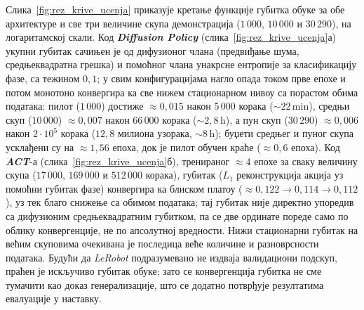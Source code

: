 \documentclass[12pt, a4paper]{article}
\begin{document}
Слика~\ref{fig:rez_krive_ucenja} приказује кретање функције губитка обуке за обе архитектуре и све три величине скупа демонстрација ($1\,000$, $10\,000$ и $30\,290$), на логаритамској скали.
Код \textbf{\textit{Diffusion Policy}} (слика~\ref{fig:rez_krive_ucenja}а) укупни губитак сачињен је од дифузионог члана (предвиђање шума, средњеквадратна грешка) и помоћног члана унакрсне ентропије за класификацију фазе, са тежином $0{,}1$; у свим конфигурацијама нагло опада током прве епохе и потом монотоно конвергира ка све нижем стационарном нивоу са порастом обима података: пилот ($1\,000$) достиже $\approx 0{,}015$ након $5\,000$ корака ($\sim\!22$\,min), средњи скуп ($10\,000$) $\approx 0{,}007$ након $66\,000$ корака ($\sim\!2{,}8$\,h), а пун скуп ($30\,290$) $\approx 0{,}006$ након $2\cdot 10^{5}$ корака ($12{,}8$ милиона узорака, $\sim\!8$\,h); буџети средњег и пуног скупа усклађени су на $\approx 1{,}56$ епоха, док је пилот обучен краће ($\approx 0{,}6$ епоха).
Код \textbf{\textit{ACT}}-а (слика~\ref{fig:rez_krive_ucenja}б), тренираног $\approx 4$ епохе за сваку величину скупа ($17\,000$, $169\,000$ и $512\,000$ корака), губитак ($L_1$ реконструкција акција уз помоћни губитак фазе) конвергира ка блиском платоу ($\approx 0{,}122 \to 0{,}114 \to 0{,}112$), уз тек благо снижење са обимом података; тај губитак није директно упоредив са дифузионим средњеквадратним губитком, па се две ординате пореде само по облику конвергенције, не по апсолутној вредности.
Нижи стационарни губитак на већим скуповима очекивана је последица веће количине и разноврсности података.
Будући да \textit{LeRobot} подразумевано не издваја валидациони подскуп, праћен је искључиво губитак обуке; зато се конвергенција губитка не сме тумачити као доказ генерализације, што се додатно потврђује резултатима евалуације у наставку.
\end{document}
